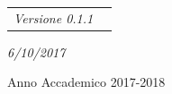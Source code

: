 \documentclass[a4paper,12pt,twoside]{report}
\newlength{\defbaselineskip}
\newcommand{\setlinespacing}[1]%
           {\setlength{\baselineskip}{#1 \defbaselineskip}}
\begin{document}
\begin{center}
\begin{center}
\begin{tabular}{l l }
\it{Versione 0.1.1} \\
\end{tabular}
\end{center}
\begin{center}
\vspace{-4mm}
\it{6/10/2017}
\end{center}
\vspace{10mm}
{\large{Anno Accademico 2017-2018}}
\end{center}



\clearpage
\newpage


\setlinespacing{1.5}









\pagestyle{fancy}
\headsep=40pt
\lhead{}
\rhead{\slshape \leftmark}
\cfoot{\thepage}


%












%


\end{document}
